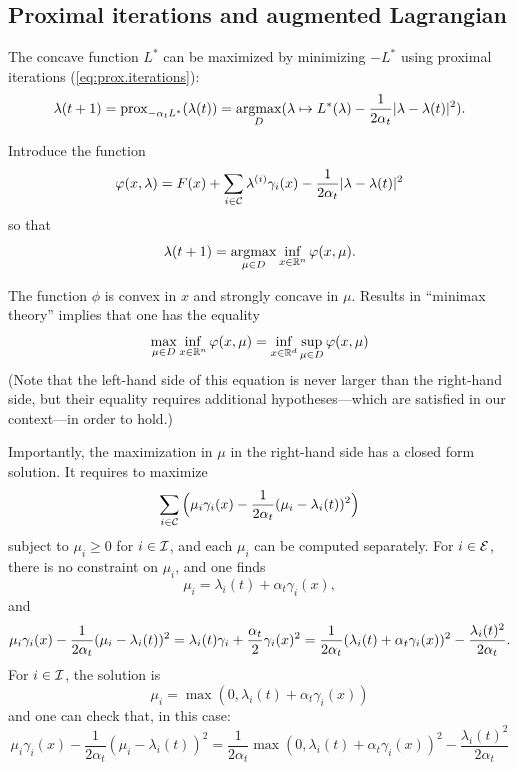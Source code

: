 \subsection{Proximal iterations and augmented Lagrangian}
The concave function $L^*$ can be maximized by minimizing $-L^*$ using proximal iterations (\cref{eq:prox.iterations}):
\[
\lambda(t+1) = \operatorname{prox}_{-\alpha_t L^*}(\lambda(t)) = \operatorname*{argmax}_D(\lambda \mapsto L^*(\lambda) - \frac{1}{2\alpha_t} |\lambda - \lambda(t)|^2).
\]

Introduce the function
\[
\varphi(x, \lambda) = F(x) + \sum_{i\in {\mathcal C}} \lambda^{(i)} \gamma_i(x) - \frac{1}{2\alpha_t} |\lambda - \lambda(t)|^2
\]
so that
\[
\lambda(t+1) = \operatorname*{argmax}_{ \mu\in D} \inf_{x \in {\mathbb{R}}^n} \varphi(x, \mu).
\]

The function $\phi$ is convex in $x$ and strongly concave in $\mu$. Results in ``minimax theory'' \cite{bertsekas2009convex} implies that one has the equality 
\begin{equation}
\label{eq:inf.sup}
\max_{\mu\in D} \inf_{x\in {\mathbb{R}}^n} \varphi(x, \mu) = \inf_{x\in {\mathbb{R}}^d} \sup_{\mu\in D} \varphi(x, \mu)
\end{equation}
(Note that the left-hand side of this equation is never larger than the right-hand side, but their equality requires additional hypotheses---which are satisfied in our context---in order to hold.)

Importantly, the maximization in $\mu$ in the right-hand side has a closed form solution. It requires to maximize
\[
\sum_{i\in {\mathcal C}} \Big(\mu_i \gamma_i(x) - \frac{1}{2\alpha_t} (\mu_i - \lambda_i(t))^2\Big)
\]
subject to $\mu_i \geq 0$ for $i\in {\mathcal I}$, and each $\mu_i$ can be computed separately.
For $i \in {\mathcal E}$, there is no constraint on $\mu_i$, and one finds
\[
\mu_i = \lambda_i(t) + \alpha_t \gamma_i(x),
\]
and
\[
\mu_i \gamma_i(x) - \frac{1}{2\alpha_t} (\mu_i - \lambda_i (t))^2 = \lambda_i(t) \gamma_i + \frac{\alpha_t}{2} \gamma_i(x)^2\\ = \frac{1}{2\alpha_t} (\lambda_i(t) + \alpha_t \gamma_i(x))^2 - \frac{\lambda_i(t)^2}{2\alpha_t}.
\]
For $i\in {\mathcal I}$, the solution is 
\[
\mu_i = \max(0, \lambda_i(t) + \alpha_t \gamma_i(x))
\]
and one can check that, in this case:
\[
\mu_i \gamma_i(x) - \frac{1}{2\alpha_t} (\mu_i - \lambda_i(t))^2 =
\frac{1}{2\alpha_t} \max(0, \lambda_i(t) + \alpha_t \gamma_i(x))^2 - \frac{\lambda_i(t)^2}{2\alpha_t}
\]

